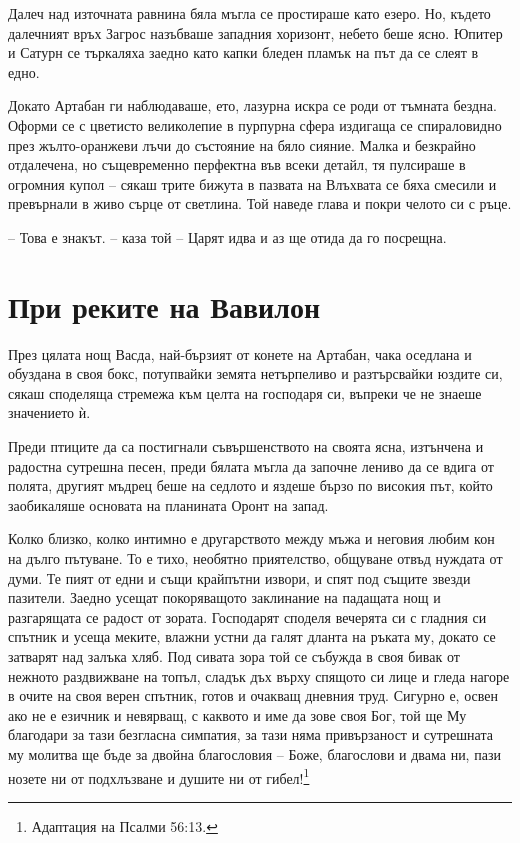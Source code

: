 Далеч над източната равнина бяла мъгла се простираше като езеро. Но, където
далечният връх Загрос назъбваше западния хоризонт, небето беше ясно. Юпитер и
Сатурн се търкаляха заедно като капки бледен пламък на път да се слеят в едно.

Докато Артабан ги наблюдаваше, ето, лазурна искра се роди от тъмната бездна.
Оформи се с цветисто великолепие в пурпурна сфера издигаща се спираловидно през
жълто-оранжеви лъчи до състояние на бяло сияние. Малка и безкрайно отдалечена,
но същевременно перфектна във всеки детайл, тя пулсираше в огромния купол --
сякаш трите бижута в пазвата на Влъхвата се бяха смесили и превърнали в живо
сърце от светлина. Той наведе глава и покри челото си с ръце.

-- Това е знакът. -- каза той -- Царят идва и аз ще отида да го посрещна.

\part{При реките на Вавилон}

През цялата нощ Васда, най-бързият от конете на Артабан, чака оседлана и
обуздана в своя бокс, потупвайки земята нетърпеливо и разтърсвайки юздите си,
сякаш споделяща стремежа към целта на господаря си, въпреки че не знаеше
значението ѝ.

Преди птиците да са постигнали съвършенството на своята ясна, изтънчена и
радостна сутрешна песен, преди бялата мъгла да започне лениво да се вдига от
полята, другият мъдрец беше на седлото и яздеше бързо по високия път, който
заобикаляше основата на планината Оронт на запад.

Колко близко, колко интимно е другарството между мъжа и неговия любим кон на
дълго пътуване. То е тихо, необятно приятелство, общуване отвъд нуждата от думи.
Те пият от едни и същи крайпътни извори, и спят под същите звезди пазители.
Заедно усещат покоряващото заклинание на падащата нощ и разгарящата се радост от
зората. Господарят споделя вечерята си с гладния си спътник и усеща меките,
влажни устни да галят дланта на ръката му, докато се затварят над залъка хляб.
Под сивата зора той се събужда в своя бивак от нежното раздвижване на топъл,
сладък дъх върху спящото си лице и гледа нагоре в очите на своя верен спътник,
готов и очакващ дневния труд. Сигурно е, освен ако не е езичник и невярващ, с
каквото и име да зове своя Бог, той ще Му благодари за тази безгласна симпатия,
за тази няма привързаност и сутрешната му молитва ще бъде за двойна благословия
-- Боже, благослови и двама ни, пази нозете ни от подхлъзване и душите ни от
гибел!\footnote{Адаптация на Псалми 56:13.}

